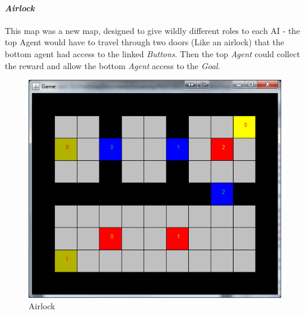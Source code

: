 \documentclass{IEEEtran}
\begin{document}
\paragraph{\emph{Airlock}} This map was a new map, designed to give wildly different roles to each AI - the top Agent would have to travel through two doors (Like an airlock) that the bottom agent had access to the linked \emph{Buttons}. Then the top \emph{Agent} could collect the reward and allow the bottom \emph{Agent} access to the \emph{Goal}.
\begin{figure}[H]
\centering
\includegraphics[scale=0.35]{level5}
\caption{Airlock}
\label{Airlock}
\end{figure}
\end{document}
